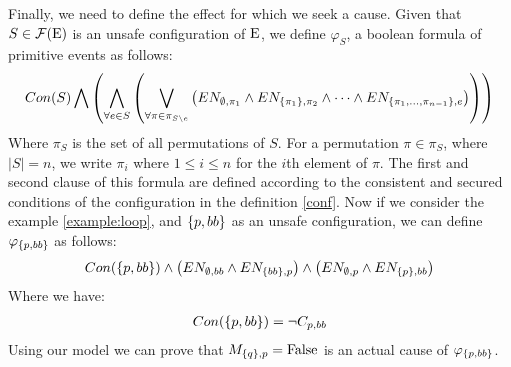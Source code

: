 Finally, we need to define the effect for which we seek a cause.
Given that $S \in \mathcal{F}(\mathrm{E})$ is an unsafe configuration of $\mathrm{E}$,
we define $\varphi_S$, a boolean formula of primitive events as follows:
\begin{align*}
    Con(S)
    \bigwedge
    \left(
        \bigwedge_{\forall e \in S}
        \left(
            \bigvee_{\forall \pi \in \pi_{S \setminus e}} 
            \left(
                EN_{\emptyset,\pi_1} \wedge
                EN_{\{\pi_1\},\pi_2} \wedge
                \dots
                \wedge
                EN_{\{\pi_1,...,\pi_{n-1}\},e}
            \right)
        \right)
    \right)
\end{align*}
\noindent Where $\pi_S$ is the set of all permutations of $S$.
For a permutation $\pi \in \pi_S$, where $|S| = n$, 
we write $\pi_i$ where $1 \leq i \leq n$ for the $i$th 
element of $\pi$.
The first and second clause of this formula are defined according to the 
consistent and secured conditions of the configuration in the definition 
\ref{conf}.
Now if we consider the example \ref{example:loop}, and $\{p,bb\}$ as an 
unsafe configuration, we can define $\varphi_{\{p,bb\}}$ as follows:
\begin{align*}
    Con(\{p,bb\}) \wedge
    \left(
        EN_{\emptyset,bb} \wedge EN_{\{bb\},p}
    \right) \wedge
    \left(
        EN_{\emptyset,p} \wedge EN_{\{p\},bb}
    \right)
\end{align*}
Where we have:
\begin{align*}
    Con(\{p,bb\}) = \neg C_{p,bb}
\end{align*}
Using our model we can prove that $M_{\{q\},p} = \mathrm{False}$ is an actual cause 
of $\varphi_{\{p,bb\}}$.

\pagebreak

